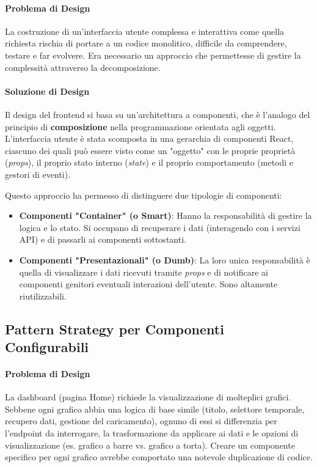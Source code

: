 \documentclass[12pt,a4paper,openright,twoside]{book}
\begin{document}
\paragraph{Problema di Design}
La costruzione di un'interfaccia utente complessa e interattiva come quella richiesta rischia di portare a un codice monolitico, difficile da comprendere, testare e far evolvere. Era necessario un approccio che permettesse di gestire la complessità attraverso la decomposizione.

\paragraph{Soluzione di Design}
Il design del frontend si basa su un'architettura a componenti, che è l'analogo del principio di \textbf{composizione} nella programmazione orientata agli oggetti. L'interfaccia utente è stata scomposta in una gerarchia di componenti React, ciascuno dei quali può essere visto come un "oggetto" con le proprie proprietà (\textit{props}), il proprio stato interno (\textit{state}) e il proprio comportamento (metodi e gestori di eventi).

Questo approccio ha permesso di distinguere due tipologie di componenti:
\begin{itemize}
    \item \textbf{Componenti "Container" (o Smart)}: Hanno la responsabilità di gestire la logica e lo stato. Si occupano di recuperare i dati (interagendo con i servizi API) e di passarli ai componenti sottostanti.
    \item \textbf{Componenti "Presentazionali" (o Dumb)}: La loro unica responsabilità è quella di visualizzare i dati ricevuti tramite \textit{props} e di notificare ai componenti genitori eventuali interazioni dell'utente. Sono altamente riutilizzabili.
\end{itemize}

\subsection{Pattern Strategy per Componenti Configurabili}
\label{subsec:design_strategy_frontend}

\paragraph{Problema di Design}
La dashboard (pagina Home) richiede la visualizzazione di molteplici grafici. Sebbene ogni grafico abbia una logica di base simile (titolo, selettore temporale, recupero dati, gestione del caricamento), ognuno di essi si differenzia per l'endpoint da interrogare, la trasformazione da applicare ai dati e le opzioni di visualizzazione (es. grafico a barre vs. grafico a torta). Creare un componente specifico per ogni grafico avrebbe comportato una notevole duplicazione di codice.
\end{document}
